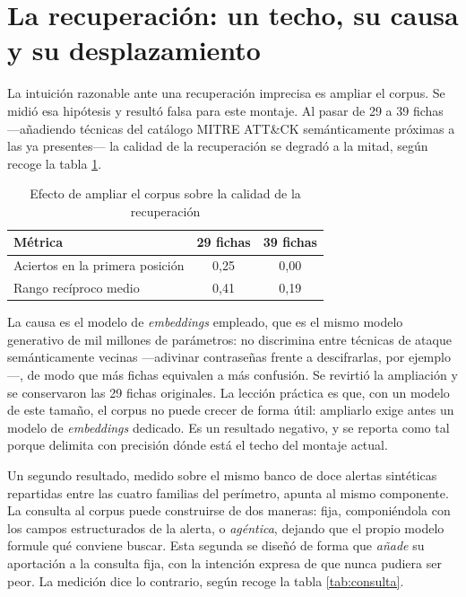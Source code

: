 \section{La recuperación: un techo, su causa y su desplazamiento}
\label{sec:mrr}

La intuición razonable ante una recuperación imprecisa es ampliar el corpus. Se midió esa hipótesis
y resultó falsa para este montaje. Al pasar de 29 a 39 fichas ---añadiendo técnicas del catálogo
MITRE ATT\&CK semánticamente próximas a las ya presentes--- la calidad de la recuperación se
degradó a la mitad, según recoge la tabla \ref{tab:mrr}.

\begin{table}[H]
  \centering
  \caption{Efecto de ampliar el corpus sobre la calidad de la recuperación}
  \label{tab:mrr}
  \begin{tabular}{@{}lcc@{}}
    \toprule
    \textbf{Métrica} & \textbf{29 fichas} & \textbf{39 fichas} \\
    \midrule
    Aciertos en la primera posición & 0,25 & 0,00 \\
    Rango recíproco medio & 0,41 & 0,19 \\
    \bottomrule
  \end{tabular}
\end{table}

La causa es el modelo de \emph{embeddings} empleado, que es el mismo modelo generativo de mil
millones de parámetros: no discrimina entre técnicas de ataque semánticamente vecinas ---adivinar
contraseñas frente a descifrarlas, por ejemplo---, de modo que más fichas equivalen a más
confusión. Se revirtió la ampliación y se conservaron las 29 fichas originales. La lección práctica
es que, con un modelo de este tamaño, el corpus no puede crecer de forma útil: ampliarlo exige
antes un modelo de \emph{embeddings} dedicado. Es un resultado negativo, y se reporta como tal
porque delimita con precisión dónde está el techo del montaje actual.

Un segundo resultado, medido sobre el mismo banco de doce alertas sintéticas repartidas entre las
cuatro familias del perímetro, apunta al mismo componente. La consulta al corpus puede construirse
de dos maneras: fija, componiéndola con los campos estructurados de la alerta, o \emph{agéntica},
dejando que el propio modelo formule qué conviene buscar. Esta segunda se diseñó de forma que
\emph{añade} su aportación a la consulta fija, con la intención expresa de que nunca pudiera ser
peor. La medición dice lo contrario, según recoge la tabla \ref{tab:consulta}.

